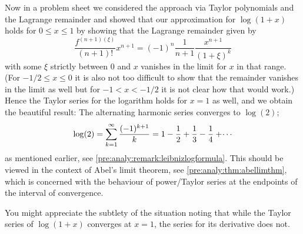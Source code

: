 \documentclass[10pt, a4paper]{article}
\begin{document}
\begin{example}[Logarithm]
    Now in a problem sheet we considered the approach via Taylor polynomials and the Lagrange remainder and showed that our approximation for $\log(1 + x)$ holds for $0 \leq x \leq 1$ by showing that the Lagrange remainder given by
    \[
    \frac{f ^ {(n + 1)(\xi)}}{(n + 1)!}x ^ {n + 1} = (-1) ^ n\frac{1}{n + 1}\frac{x ^ {n + 1}}{(1 + \xi) ^ k}
    \]
    with some $\xi$ strictly between $0$ and $x$ vanishes in the limit for $x$ in that range.
    (For $-1 / 2 \leq x \leq 0$ it is also not too difficult to show that the remainder vanishes in the limit as well but for $-1 < x < -1 / 2$ it is not clear how that would work.)
    Hence the Taylor series for the logarithm holds for $x = 1$ as well,
    and we obtain the beautiful result:
    The alternating harmonic series converges to $\log(2)$;
    \[
    \log(2) = \sum_{k = 1}^{\infty}\frac{(-1) ^ {k + 1}}{k} = 1 - \frac{1}{2} + \frac{1}{3} - \frac{1}{4} + \dotsi
    \]
    as mentioned earlier,
    see \autoref{pre:analy:remark:leibnizlogformula}.
    This should be viewed in the context of Abel's limit theorem,
    see \autoref{pre:analy:thm:abellimthm},
    which is concerned with the behaviour of power/Taylor series at the endpoints of the interval of convergence.
    
    You might appreciate the subtlety of the situation noting that while the Taylor series of $\log(1 + x)$ converges at $x = 1$,
    the series for its derivative does not.
\end{example}
\end{document}
